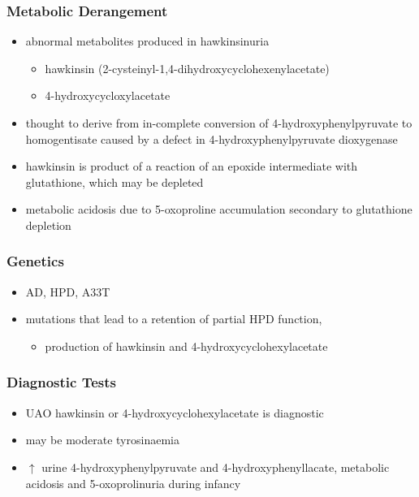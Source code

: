 \documentclass{scrartcl}
\begin{document}
\subsubsection{Metabolic Derangement}
\label{sec:org3b5a381}
\begin{itemize}
\item abnormal metabolites produced in hawkinsinuria
\begin{itemize}
\item hawkinsin (2-cysteinyl-1,4-dihydroxycyclohexenylacetate)
\item 4-hydroxycycloxylacetate
\end{itemize}
\item thought to derive from in-complete conversion of
4-hydroxyphenylpyruvate to homogentisate caused by a defect in
4-hydroxyphenylpyruvate dioxygenase
\end{itemize}
\begin{itemize}
\item hawkinsin is product of a reaction of an epoxide intermediate with
glutathione, which may be depleted
\item metabolic acidosis due to 5-oxoproline accumulation secondary to
glutathione depletion
\end{itemize}

\subsubsection{Genetics}
\label{sec:orgace6e95}
\begin{itemize}
\item AD, HPD, A33T
\item mutations that lead to a retention of partial HPD function,
\begin{itemize}
\item production of hawkinsin and 4-hydroxycyclohexylacetate
\end{itemize}
\end{itemize}
\subsubsection{Diagnostic Tests}
\label{sec:org6e9b839}
\begin{itemize}
\item UAO hawkinsin or 4-hydroxycyclohexylacetate is diagnostic
\item may be moderate tyrosinaemia
\item \(\uparrow\) urine 4-hydroxyphenylpyruvate and 4-hydroxyphenyllacate,
metabolic acidosis and 5-oxoprolinuria during infancy
\end{itemize}
\end{document}
